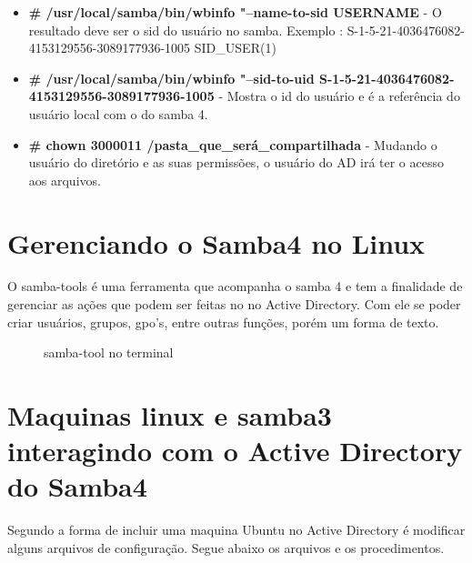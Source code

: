 \begin{itemize}
	\item \textbf{\# /usr/local/samba/bin/wbinfo "--name-to-sid USERNAME} - O resultado deve ser o sid do usuário no samba. Exemplo : S-1-5-21-4036476082-4153129556-3089177936-1005 SID\_USER(1)
	\item \textbf{\# /usr/local/samba/bin/wbinfo "--sid-to-uid S-1-5-21-4036476082-4153129556-3089177936-1005} - Mostra o id do usuário e é a referência do usuário local com o do samba 4.
	\item \textbf{\# chown 3000011 /pasta\_que\_será\_compartilhada} - Mudando o usuário do diretório e as suas permissões, o usuário do AD irá ter o acesso aos arquivos.
\end{itemize} 

\section{Gerenciando o Samba4 no Linux}

O samba-tools é uma ferramenta que acompanha o samba 4 e tem a finalidade de gerenciar as ações que podem ser feitas no no Active Directory. Com ele se poder criar usuários, grupos, gpo's, entre outras funções, porém um forma de texto.

\begin{figure}[ht]
   	\centering
   	\caption{samba-tool no terminal}
    \label{Samba-tool}
\end{figure}

\section{Maquinas linux e samba3 interagindo com o Active Directory do  Samba4}

Segundo \cite{UBUNTU-WIKI} a forma de incluir uma maquina Ubuntu no Active Directory é modificar alguns arquivos de configuração.
Segue abaixo os arquivos e os procedimentos.

